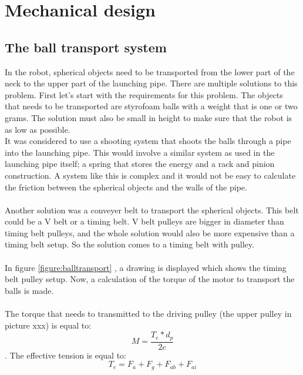 \documentclass[11pt,twoside,a4paper]{report}
\begin{document}
\section{Mechanical design}
\subsection{The ball transport system }
In the robot, spherical objects need to be transported from the lower part of the neck to the upper part of the launching pipe. There are multiple solutions to this problem. First let’s start with the requirements for this problem. The objects that needs to be transported are styrofoam balls with a weight that is one or two grams. The solution must also be small in height to make sure that the robot is as low as possible.  \\
It was considered to use a shooting system that shoots the balls through a pipe into the launching pipe. This would involve a similar system as used in the launching pipe itself; a spring that stores the energy and a rack and pinion construction. A system like this is complex and it would not be easy to calculate the friction between the spherical objects and the walls of the pipe.\\
\\
Another solution was a conveyer belt to transport the spherical objects. This belt could be a V belt or a timing belt. V belt pulleys are bigger in diameter than timing belt pulleys, and the whole solution would also be more expensive than a timing belt setup. So the solution comes to a timing belt with pulley.\\
\\
In figure \ref{figure:balltransport} , a drawing is displayed which shows the timing belt pulley setup. Now, a calculation of the torque of the motor to transport the balls is made.\\
\\The torque that needs to transmitted to the driving pulley (the upper pulley in picture xxx) is equal to: \[M=\frac{T_{e}*d_{p}}{2c}  \].
The effective tension is equal to:
\[T_{e}=F_{a}+F_{g}+F_{ab}+F_{ai}  \]
\end{document}
